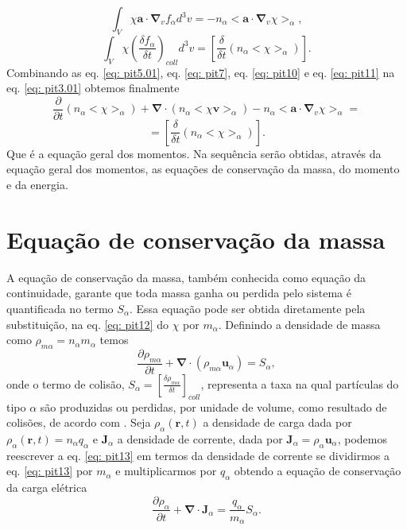 \documentclass[12pt,oneside,a4paper]{abntex2}
\begin{document}
\begin{equation}
\label{eq: pit10}
\int_V \chi \bm{a} \cdot \bm{\nabla}_v f_\alpha d^3 v = -n_\alpha<\bm{a} \cdot \bm{\nabla}_v \chi>_\alpha,
\end{equation}
\begin{equation}
\label{eq: pit11}
\int_V \chi \left( \frac{\delta f_\alpha}{\delta t} \right)_{coll} d^3 v = \left[\frac{\delta}{\delta t}(n_\alpha<\chi>_\alpha)\right].
\end{equation}
Combinando as eq. \ref{eq: pit5.01}, eq. \ref{eq: pit7}, eq. \ref{eq: pit10} e eq. \ref{eq: pit11} na eq. \ref{eq: pit3.01} obtemos finalmente 
\begin{equation}
\label{eq: pit12}
\frac{\partial }{\partial t}(n_\alpha<\chi>_\alpha) + \bm{\nabla} \cdot (n_\alpha<\chi \bm{v} >_\alpha) - n_\alpha<\bm{a} \cdot \bm{\nabla}_v \chi>_\alpha = 
\end{equation}
\begin{equation*}
=[\frac{\delta}{\delta t}(n_\alpha<\chi>_\alpha)].
\end{equation*}
Que é a equação geral dos momentos. Na sequência serão obtidas, através da equação geral dos momentos, as equações de conservação da massa, do momento e da energia.
\section{Equação de conservação da massa}
\noindent A equação de conservação da massa, também conhecida como equação da continuidade, garante que toda massa ganha ou perdida pelo sistema é quantificada no termo $S_\alpha$.
Essa equação pode ser obtida diretamente pela substituição, na eq. \ref{eq: pit12} do $\chi$ por $m_\alpha$. 
Definindo a densidade de massa como $ \rho_{m\alpha} = n_\alpha m_\alpha$ temos
\begin{equation}
\label{eq: pit13}
\frac{\partial \rho_{m\alpha}}{\partial t} + \bm{\nabla} \cdot (\rho_{m\alpha} \bm{u}_\alpha)  = S_\alpha, 
\end{equation}
onde o termo de colisão, $S_\alpha = \left[\frac{\delta \rho_{m\alpha}}{\delta t}\right]_{coll}$, representa a taxa na qual partículas do tipo $\alpha$ são produzidas ou perdidas, por unidade de volume, como resultado de colisões, de acordo com \cite[pg. 197]{bittencourt}.
Seja $\rho_\alpha(\bm{r},t)$ a densidade de carga dada por $\rho_\alpha(\bm{r},t)=n_\alpha q_\alpha$ e $\bm{J}_\alpha$ a densidade de corrente, dada por $\bm{J}_\alpha=\rho_\alpha \bm{u}_\alpha$, podemos reescrever a eq. \ref{eq: pit13} em termos da densidade de corrente se dividirmos a eq. \ref{eq: pit13} por $m_\alpha$ e  multiplicarmos por $q_\alpha$ obtendo a equação de conservação da carga elétrica
\begin{equation}
\label{eq: pit13.001}
\frac{\partial \rho_{\alpha}}{\partial t} + \bm{\nabla} \cdot \bm{J}_\alpha  = \frac{q_\alpha}{m_\alpha} S_\alpha.
\end{equation}
 
\end{document}
